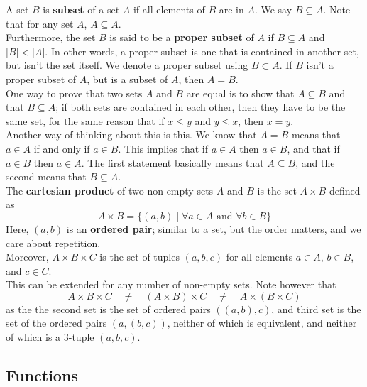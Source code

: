 \documentclass[12pt]{article}
\begin{document}
    A set $B$ is \textbf{subset} of a set $A$
    if all elements of $B$ are in $A$.
    We say $B \subseteq A$.
    Note that for any set $A$, $A \subseteq A$. \\
    Furthermore, the set $B$ is said to be a
    \textbf{proper subset} of $A$ if $B \subseteq A$
    and $|B| < |A|$.
    In other words, a proper subset is one that is
    contained in another set, but isn't the set itself.
    We denote a proper subset using $B \subset A$.
    If $B$ isn't a proper subset of $A$,
    but is a subset of $A$, then $A = B$. \\

    One way to prove that two sets $A$ and $B$
    are equal is to show that $A \subseteq B$
    and that $B \subseteq A$;
    if both sets are contained in each other,
    then they have to be the same set,
    for the same reason that if $x \leqslant y$
    and $y \leqslant x$, then $x = y$. \\ 
    Another way of thinking about this is this. 
    We know that $A = B$
    means that $a \in A$ if and only if $a \in B$.
    This implies that if $a \in A$ then $a \in B$,
    and that if $a \in B$ then $a \in A$.
    The first statement basically means that $A \subseteq B$,
    and the second means that $B \subseteq A$. \\

    The \textbf{cartesian product} of two non-empty sets $A$ and $B$
    is the set $A \times B$ defined as
    \[ A \times B = \{ (a, b) \mid
    \forall a \in A \text{ and } \forall b \in B \} \]
    Here, $(a, b)$ is an \textbf{ordered pair};
    similar to a set, but the order matters,
    and we care about repetition. \\
    Moreover, $A \times B \times C$
    is the set of tuples $(a, b, c)$
    for all elements $a \in A$, $b \in B$, and $c \in C$. \\
    This can be extended for any number of non-empty sets.
    Note however that
    \[ A \times B \times C \quad \neq \quad (A \times B) \times C 
    \quad \neq \quad A \times (B \times C) \]
    as the the second set is the set of
    ordered pairs $((a, b),  c)$,
    and third set is the set of
    the ordered pairs $(a, (b, c))$,
    neither of which is equivalent,
    and neither of which is a $3$-tuple $(a, b, c)$. \\


    \subsection*{Functions}
\end{document}
